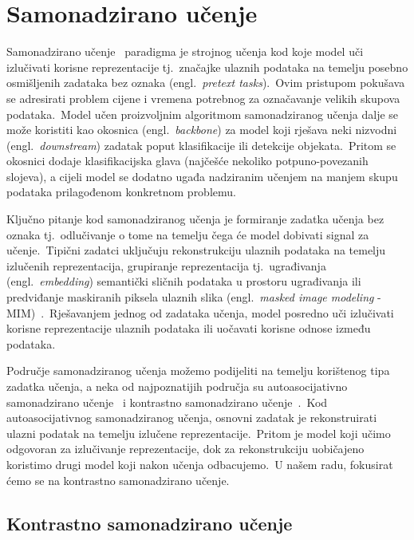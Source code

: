 \documentclass[diplomskirad]{fer}
\begin{document}
\chapter{Samonadzirano učenje}
\label{pog:samonadzirano}

Samonadzirano učenje~\cite{jaiswal2020survey} paradigma je strojnog učenja kod koje model uči izlučivati korisne reprezentacije tj.\ značajke ulaznih podataka na temelju posebno osmišljenih zadataka bez oznaka (engl.\ \textit{pretext tasks}).\ 
Ovim pristupom pokušava se adresirati problem cijene i vremena potrebnog za označavanje velikih skupova podataka.\ 
Model učen proizvoljnim algoritmom samonadziranog učenja dalje se može koristiti kao okosnica (engl.\ \textit{backbone}) za model koji rješava neki nizvodni (engl.\ \textit{downstream}) zadatak poput klasifikacije ili detekcije objekata.\ 
Pritom se okosnici dodaje klasifikacijska glava (najčešće nekoliko potpuno-povezanih slojeva), a cijeli model se dodatno ugađa nadziranim učenjem na manjem skupu podataka prilagođenom konkretnom problemu.\ 
  
Ključno pitanje kod samonadziranog učenja je formiranje zadatka učenja bez oznaka tj.\ odlučivanje o tome na temelju čega će model dobivati signal za učenje.\ 
Tipični zadatci uključuju rekonstrukciju ulaznih podataka na temelju izlučenih reprezentacija, grupiranje reprezentacija tj.\ ugrađivanja (engl.\ \textit{embedding}) semantički sličnih podataka u prostoru ugrađivanja ili predviđanje maskiranih piksela ulaznih slika (engl.\ \textit{masked image modeling} - MIM)~\cite{hondru2024masked}.\
Rješavanjem jednog od zadataka učenja, model posredno uči izlučivati korisne reprezentacije ulaznih podataka ili uočavati korisne odnose između podataka.\ 
  
Područje samonadziranog učenja možemo podijeliti na temelju korištenog tipa zadatka učenja, a neka od najpoznatijih područja su autoasocijativno samonadzirano učenje~\cite{kramer1991nonlinear} i kontrastno samonadzirano učenje~\cite{jaiswal2020survey}.\ 
Kod autoasocijativnog samonadziranog učenja, osnovni zadatak je rekonstruirati ulazni podatak na temelju izlučene reprezentacije.\ Pritom je model koji učimo odgovoran za izlučivanje reprezentacije, dok za rekonstrukciju uobičajeno koristimo drugi model koji nakon učenja odbacujemo.\
U našem radu, fokusirat ćemo se na kontrastno samonadzirano učenje.\ 

\section{Kontrastno samonadzirano učenje}
\label{sek:contrastive}
\end{document}
